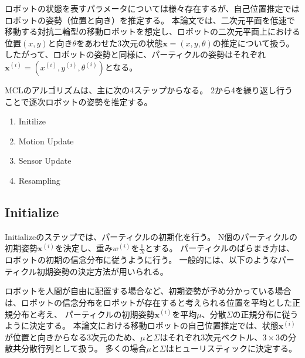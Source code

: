 ロボットの状態を表すパラメータについては様々存在するが、自己位置推定ではロボットの姿勢（位置と向き）を推定する。
本論文では、二次元平面を低速で移動する対抗二輪型の移動ロボットを想定し、ロボットの二次元平面上における位置$(x, y)$と向き$\theta$をあわせた3次元の状態$\bm{x} = (x, y, \theta)$の推定について扱う。
したがって、ロボットの姿勢と同様に、パーティクルの姿勢はそれぞれ$\bm{x}^{(i)} = (x^{(i)}, y^{(i)}, \theta^{(i)})$となる。


MCLのアルゴリズムは、主に次の4ステップからなる。
2から4を繰り返し行うことで逐次ロボットの姿勢を推定する。
\begin{enumerate}
  \item Initilize
  \item Motion Update
  \item Sensor Update
  \item Resampling
\end{enumerate}




\subsection{Initialize}

Initializeのステップでは、パーティクルの初期化を行う。
N個のパーティクルの初期姿勢$\bm{x}^{(i)}$を決定し、重み$w^{(i)}$を$\frac{1}{N}$とする。
パーティクルのばらまき方は、ロボットの初期の信念分布に従うように行う。
一般的には、以下のようなパーティクル初期姿勢の決定方法が用いられる。

ロボットを人間が自由に配置する場合など、初期姿勢が予め分かっている場合は、ロボットの信念分布をロボットが存在すると考えられる位置を平均とした正規分布と考え、
パーティクルの初期姿勢$\bm{x}^{(i)}$を平均$\mu$、分散$\Sigma$の正規分布に従うように決定する。
本論文における移動ロボットの自己位置推定では、状態$\bm{x}^{(i)}$が位置と向きからなる3次元のため、$\mu$と$\Sigma$はそれぞれ3次元ベクトル、$3\times3$の分散共分散行列として扱う。
多くの場合$\mu$と$\Sigma$はヒューリスティックに決定する。

